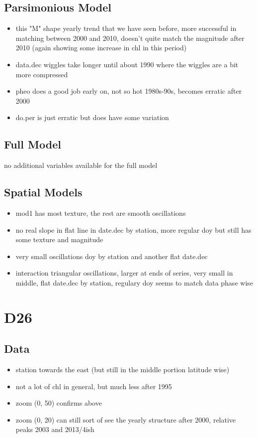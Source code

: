 \documentclass[12pt]{amsart}
\begin{document}
\subsection{Parsimonious Model}
\begin{itemize}
\item this "M" shape yearly trend that we have seen before, more successful in matching between 2000 and 2010, doesn't quite match the magnitude after 2010 (again showing some increase in chl in this period)
\item data.dec wiggles take longer until about 1990 where the wiggles are a bit more compressed
\item pheo does a good job early on, not so hot 1980s-90s, becomes erratic after 2000
\item do.per is just erratic but does have some variation
\end{itemize}
\subsection{Full Model}
\begin{itemize}
\ite no additional variables available for the full model
\end{itemize}

\subsection{Spatial Models}

\begin{itemize}
\item mod1 has most texture, the rest are smooth oscillations
\item no real slope in flat line in date.dec by station, more regular doy but still has some texture and magnitude
\item very small oscillations doy by station and another flat date.dec
\item interaction triangular oscillations, larger at ends of series, very small in middle, flat date.dec by station, regulary doy seems to match data phase wise
\end{itemize}

\section{D26}
\subsection{Data}
\begin{itemize}
\item station towards the east (but still in the middle portion latitude wise)
\item not a lot of chl in general, but much less after 1995
\item zoom (0, 50) confirms above
\item zoom (0, 20) can still sort of see the yearly structure after 2000, relative peaks 2003 and 2013/4ish
\end{itemize}
\end{document}

